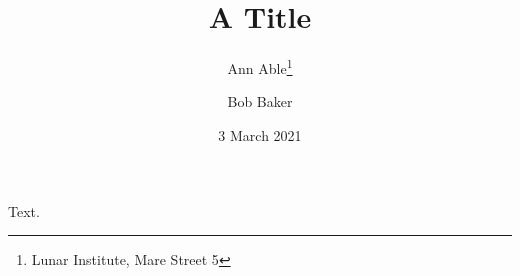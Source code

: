 \documentclass{article}
\begin{document}
\title{A Title}
\author{Ann Able\thanks{Lunar Institute, Mare Street 5}\and Bob Baker}
\date{3 March 2021}
\maketitle
Text.
\end{document}
